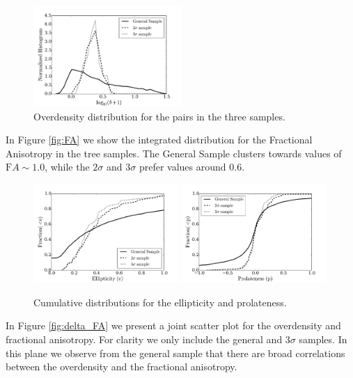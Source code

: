 \documentclass{emulateapj}
\begin{document}
\begin{figure}
\begin{center}
  \includegraphics[width=0.50\textwidth]{density_histogram.pdf}
\end{center}
\caption{Overdensity distribution for the pairs in the three samples.
    \label{fig:density}}  
\end{figure}


In Figure \ref{fig:FA} we show the integrated distribution for the
Fractional Anisotropy in the tree samples. The General Sample clusters
towards values of ${\mathrm FA}\sim 1.0$, while the $2\sigma$ and
$3\sigma$ prefer values around $0.6$.

\begin{figure}
\begin{center}
  \includegraphics[width=0.49\textwidth]{ELL_histogram.pdf}
  \includegraphics[width=0.49\textwidth]{PROL_histogram.pdf}
\end{center}
\caption{Cumulative distributions for the ellipticity and prolateness.
    \label{fig:ELL_PROL}}  
\end{figure}

In Figure \ref{fig:delta_FA} we present a joint scatter plot for the
overdensity and fractional anisotropy. For clarity we only include the
general and $3\sigma$ samples. In this plane we observe from the general
sample that there are broad correlations between the overdensity and
the fractional anisotropy. 
\end{document}
